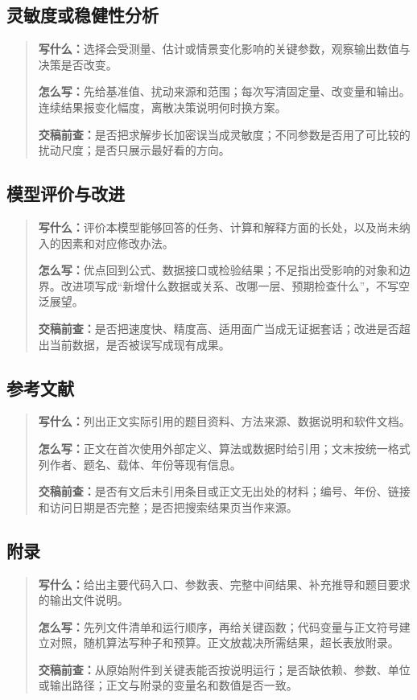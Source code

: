 \documentclass[UTF8,zihao=-4]{ctexart}
\begin{document}
\subsection{灵敏度或稳健性分析}
\begin{quote}\small
\noindent\textbf{\color{inkblue}写什么：}选择会受测量、估计或情景变化影响的关键参数，观察输出数值与决策是否改变。\par
\noindent\textbf{\color{inkblue}怎么写：}先给基准值、扰动来源和范围；每次写清固定量、改变量和输出。连续结果报变化幅度，离散决策说明何时换方案。\par
\noindent\textbf{\color{inkblue}交稿前查：}是否把求解步长加密误当成灵敏度；不同参数是否用了可比较的扰动尺度；是否只展示最好看的方向。
\end{quote}

\subsection{模型评价与改进}
\begin{quote}\small
\noindent\textbf{\color{inkblue}写什么：}评价本模型能够回答的任务、计算和解释方面的长处，以及尚未纳入的因素和对应修改办法。\par
\noindent\textbf{\color{inkblue}怎么写：}优点回到公式、数据接口或检验结果；不足指出受影响的对象和边界。改进项写成“新增什么数据或关系、改哪一层、预期检查什么”，不写空泛展望。\par
\noindent\textbf{\color{inkblue}交稿前查：}是否把速度快、精度高、适用面广当成无证据套话；改进是否超出当前数据，是否被误写成现有成果。
\end{quote}

\subsection{参考文献}
\begin{quote}\small
\noindent\textbf{\color{inkblue}写什么：}列出正文实际引用的题目资料、方法来源、数据说明和软件文档。\par
\noindent\textbf{\color{inkblue}怎么写：}正文在首次使用外部定义、算法或数据时给引用；文末按统一格式列作者、题名、载体、年份等现有信息。\par
\noindent\textbf{\color{inkblue}交稿前查：}是否有文后未引用条目或正文无出处的材料；编号、年份、链接和访问日期是否完整；是否把搜索结果页当作来源。
\end{quote}

\subsection{附录}
\begin{quote}\small
\noindent\textbf{\color{inkblue}写什么：}给出主要代码入口、参数表、完整中间结果、补充推导和题目要求的输出文件说明。\par
\noindent\textbf{\color{inkblue}怎么写：}先列文件清单和运行顺序，再给关键函数；代码变量与正文符号建立对照，随机算法写种子和预算。正文放裁决所需结果，超长表放附录。\par
\noindent\textbf{\color{inkblue}交稿前查：}从原始附件到关键表能否按说明运行；是否缺依赖、参数、单位或输出路径；正文与附录的变量名和数值是否一致。
\end{quote}
\end{document}
